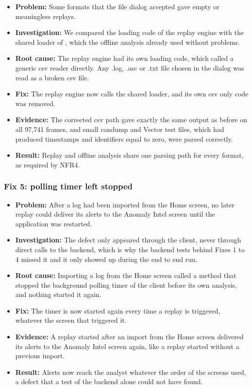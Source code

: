 \begin{itemize}
    \item \textbf{Problem:} Some formats that the file dialog accepted gave empty or meaningless replays.
    \item \textbf{Investigation:} We compared the loading code of the replay engine with the shared loader of , which the offline analysis already used without problems.
    \item \textbf{Root cause:} The replay engine had its own loading code, which called a generic \gls{csv} reader directly. Any .log, .asc or .txt file chosen in the dialog was read as a broken \gls{csv} file.
    \item \textbf{Fix:} The replay engine now calls the shared loader, and its own \gls{csv} only code was removed.
    \item \textbf{Evidence:} The corrected \gls{csv} path gave exactly the same output as before on all 97{,}741 frames, and small candump and Vector test files, which had produced timestamps and identifiers equal to zero, were parsed correctly.
    \item \textbf{Result:} Replay and offline analysis share one parsing path for every format, as required by NFR4.
\end{itemize}

\subsubsection{Fix 5: polling timer left stopped}

\begin{itemize}
    \item \textbf{Problem:} After a log had been imported from the Home screen, no later replay could deliver its alerts to the Anomaly Intel screen until the application was restarted.
    \item \textbf{Investigation:} The defect only appeared through the client, never through direct calls to the backend, which is why the backend tests behind Fixes 1 to 4 missed it and it only showed up during the end to end run.
    \item \textbf{Root cause:} Importing a log from the Home screen called a method that stopped the background polling timer of the client before its own analysis, and nothing started it again.
    \item \textbf{Fix:} The timer is now started again every time a replay is triggered, whatever the screen that triggered it.
    \item \textbf{Evidence:} A replay started after an import from the Home screen delivered its alerts to the Anomaly Intel screen again, like a replay started without a previous import.
    \item \textbf{Result:} Alerts now reach the analyst whatever the order of the screens used, a defect that a test of the backend alone could not have found.
\end{itemize}

